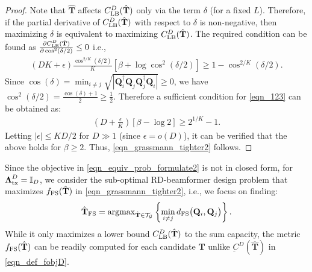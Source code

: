 \documentclass[journal,comsoc]{IEEEtran}
\begin{document}
\begin{proof}
Note that $\hat{\mathbf{T}}$ affects $C^{D}_{\rm LB}(\hat{\mathbf{T}})$ only via the term $\delta$ (for a fixed $L$). Therefore, if the partial derivative of $C^{D}_{\rm LB}(\hat{\mathbf{T}})$ with respect to $\delta$ is non-negative, then maximizing $\delta$ is equivalent to maximizing $C^{D}_{\rm LB}(\hat{\mathbf{T}})$. The required condition can be found as $\frac{\partial C^{D}_{\rm LB}(\hat{\mathbf{T}})}{ \partial \cos^2(\delta/2) } \leq 0$ i.e.,
\begin{eqnarray}
(DK \!\!+\! \epsilon) \frac{\cos^{2/K}(\delta/2)}{K} [\beta \!+\! \log \cos^{2}(\delta/2)] \geq 1 \!-\! \cos^{2/K}(\delta/2). \label{eqn_123}
\end{eqnarray}
Since $ \cos(\delta) = \min_{i\neq j} \sqrt{|\mathbf{Q}_i^{\dag} \mathbf{Q}_j \mathbf{Q}_j^{\dag} \mathbf{Q}_i|} \geq 0$, we have $\cos^{2}(\delta/2) = \frac{\cos(\delta)+1}{2} \geq \frac{1}{2}$. 
Therefore a sufficient condition for \eqref{eqn_123} can be obtained as:
\begin{eqnarray}
(D + \frac{\epsilon}{K}) [\beta - \log 2] \geq 2^{1/K} -1. \nonumber %
\end{eqnarray}
Letting $|\epsilon| \leq K D/2$ for $D \gg 1$ \big(since $\epsilon = o(D)$\big), it can be verified that the above holds for $\beta \geq 2$. Thus, \eqref{eqn_grassmann_tighter2} follows. 
\end{proof}

Since the objective in \eqref{eqn_equiv_prob_formulate2} is not in closed form, for $\boldsymbol{\Lambda}_{\rm tx}^{D} = \mathbb{I}_D$, we consider the sub-optimal RD-beamformer design problem that maximizes  $f_{\rm FS}(\hat{\mathbf{T}})$ in \eqref{eqn_grassmann_tighter2}, i.e., we focus on finding: 
\begin{eqnarray}
\hat{\mathbf{T}}_{\rm FS} = {\rm argmax}_{\hat{\mathbf{T}} \in \mathcal{T}_{\mathcal{G}}} \left \{ \min_{i \neq j} d_{\rm FS} \big( \mathbf{Q}_i, \mathbf{Q}_j \big) \right \}. 
\label{eqn_opt_prbm_Grassmann}
\end{eqnarray}
While it only maximizes a lower bound $C^{D}_{\rm LB}(\hat{\mathbf{T}})$ to the sum capacity, the metric $f_{\rm FS}(\hat{\mathbf{T}})$ can be readily computed for each candidate $\hat{\mathbf{T}}$ unlike $\underbar{C}^{D}(\hat{\mathbf{T}})$ in \eqref{eqn_def_fobjD}. 
\end{document}
